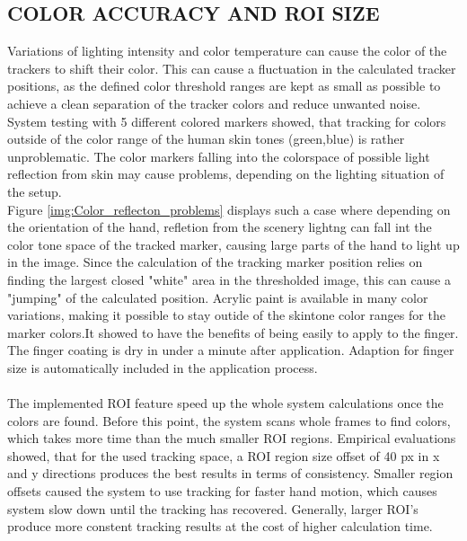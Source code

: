 \subsection{COLOR ACCURACY AND ROI SIZE}
Variations of lighting intensity and color temperature  can cause the color of the trackers to shift their color. This can cause a fluctuation in the calculated tracker positions, as the defined color threshold ranges are kept as small as possible to achieve a clean separation of the tracker colors and reduce unwanted noise. \\
System testing with 5 different colored markers showed, that tracking for colors outside of the color range of the human skin tones (green,blue) is rather unproblematic. The color markers falling into the colorspace of possible light reflection from skin may cause problems, depending on the lighting situation of the setup.
\\Figure \ref{img:Color_reflecton_problems} displays such a case where depending on the orientation of the hand, refletion from the scenery lightng can fall int the color tone space of the tracked marker, causing large parts of the hand to light up in the image. Since the calculation of the tracking marker position relies on finding the largest closed "white" area in the thresholded image, this can cause a "jumping" of the calculated position.
Acrylic paint is available in many color variations, making it possible to stay outide of the skintone color ranges for the marker colors.It showed to have the benefits of being easily to apply to the finger. The finger coating is dry in under a minute after application. Adaption for finger size is automatically included in the application process.  
\\\\The implemented ROI feature speed up the whole system calculations once the colors are found. Before this point, the system scans whole frames to find colors, which takes more time than the much smaller ROI regions.
Empirical evaluations showed, that for the used tracking space, a ROI region size offset of 40 px in x and y directions produces the best results in terms of consistency. Smaller region offsets caused the system to use tracking for faster hand motion, which causes system slow down until the tracking has recovered. Generally, larger ROI's produce more constent tracking results at the cost of higher calculation time.

